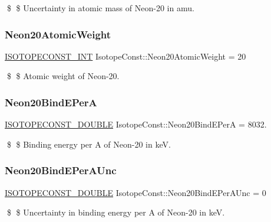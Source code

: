 \$ \$ Uncertainty in atomic mass of Neon-\/20 in amu. \mbox{\label{group___isotope_const-_neon-_ne20_gae14aeac962e84a98a6d802108538d356}} 
\subsubsection{\texorpdfstring{Neon20\+Atomic\+Weight}{Neon20AtomicWeight}}
{\footnotesize\ttfamily \mbox{\hyperlink{group___isotope_const-_macros_ga5f18360b3e99483a35c32d789e62621c}{I\+S\+O\+T\+O\+P\+E\+C\+O\+N\+S\+T\+\_\+\+I\+NT}} Isotope\+Const\+::\+Neon20\+Atomic\+Weight = 20}

\$ \$ Atomic weight of Neon-\/20. \mbox{\label{group___isotope_const-_neon-_ne20_gadc70fb3877f41b7718f09ba15ba24a4f}} 
\subsubsection{\texorpdfstring{Neon20\+Bind\+E\+PerA}{Neon20BindEPerA}}
{\footnotesize\ttfamily \mbox{\hyperlink{group___isotope_const-_macros_ga8f45a7272ce02c0b4c65c44636ed719a}{I\+S\+O\+T\+O\+P\+E\+C\+O\+N\+S\+T\+\_\+\+D\+O\+U\+B\+LE}} Isotope\+Const\+::\+Neon20\+Bind\+E\+PerA = 8032.}

\$ \$ Binding energy per A of Neon-\/20 in keV. \mbox{\label{group___isotope_const-_neon-_ne20_gac3ab1a9fd186d04b4c6d7c80f3eafc02}} 
\subsubsection{\texorpdfstring{Neon20\+Bind\+E\+Per\+A\+Unc}{Neon20BindEPerAUnc}}
{\footnotesize\ttfamily \mbox{\hyperlink{group___isotope_const-_macros_ga8f45a7272ce02c0b4c65c44636ed719a}{I\+S\+O\+T\+O\+P\+E\+C\+O\+N\+S\+T\+\_\+\+D\+O\+U\+B\+LE}} Isotope\+Const\+::\+Neon20\+Bind\+E\+Per\+A\+Unc = 0}

\$ \$ Uncertainty in binding energy per A of Neon-\/20 in keV. \mbox{\label{group___isotope_const-_neon-_ne20_ga86c24f5cc79ad6dba08fd0f60e7783d0}} 
